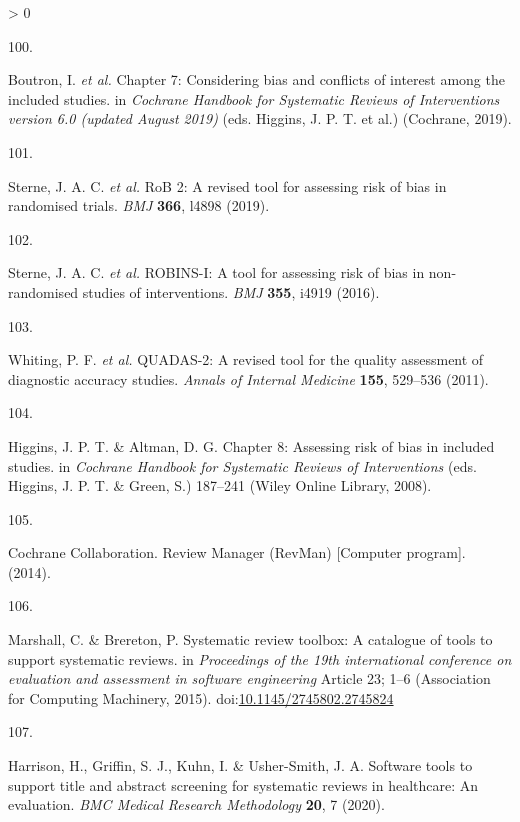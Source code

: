 \documentclass[a4paper, twoside]{templates/ociamthesis}
\newlength{\cslhangindent}
\newlength{\csllabelwidth}
\newenvironment{CSLReferences}[3] %
 {%
  \setlength{\parindent}{0pt}
  \ifodd #1 \everypar{\setlength{\hangindent}{\cslhangindent}}\ignorespaces\fi
  \ifnum #2 > 0
  \setlength{\parskip}{#2\baselineskip}
  \fi
 }%
 {}
\newcommand{\CSLLeftMargin}[1]{\parbox[t]{\maxof{\widthof{#1}}{\csllabelwidth}}{#1}}
\newcommand{\CSLRightInline}[1]{\parbox[t]{\linewidth - \csllabelwidth}{#1}}
\begin{document}
\begin{CSLReferences}{0}{0}
\leavevmode\hypertarget{ref-cochranechpt7}{}%
\CSLLeftMargin{100. }
\CSLRightInline{Boutron, I. \emph{et al.} Chapter 7: {Considering} bias and conflicts of interest among the included studies. in \emph{Cochrane {Handbook} for {Systematic Reviews} of {Interventions} version 6.0 (updated {August} 2019)} (eds. Higgins, J. P. T. et al.) ({Cochrane}, 2019).}

\leavevmode\hypertarget{ref-sterne2019rob}{}%
\CSLLeftMargin{101. }
\CSLRightInline{Sterne, J. A. C. \emph{et al.} {RoB} 2: A revised tool for assessing risk of bias in randomised trials. \emph{BMJ} \textbf{366}, l4898 (2019).}

\leavevmode\hypertarget{ref-sterne2016robins}{}%
\CSLLeftMargin{102. }
\CSLRightInline{Sterne, J. A. C. \emph{et al.} {ROBINS}-{I}: A tool for assessing risk of bias in non-randomised studies of interventions. \emph{BMJ} \textbf{355}, i4919 (2016).}

\leavevmode\hypertarget{ref-whiting2011quadas}{}%
\CSLLeftMargin{103. }
\CSLRightInline{Whiting, P. F. \emph{et al.} {QUADAS}-2: A revised tool for the quality assessment of diagnostic accuracy studies. \emph{Annals of Internal Medicine} \textbf{155}, 529--536 (2011).}

\leavevmode\hypertarget{ref-higgins2008assessing}{}%
\CSLLeftMargin{104. }
\CSLRightInline{Higgins, J. P. T. \& Altman, D. G. Chapter 8: {Assessing} risk of bias in included studies. in \emph{Cochrane {Handbook} for {Systematic Reviews} of {Interventions}} (eds. Higgins, J. P. T. \& Green, S.) 187--241 ({Wiley Online Library}, 2008).}

\leavevmode\hypertarget{ref-cochrane2014review}{}%
\CSLLeftMargin{105. }
\CSLRightInline{Cochrane Collaboration. Review {Manager} ({RevMan}) {[}{Computer} program{]}. (2014).}

\leavevmode\hypertarget{ref-marshall2015systematic}{}%
\CSLLeftMargin{106. }
\CSLRightInline{Marshall, C. \& Brereton, P. Systematic review toolbox: A catalogue of tools to support systematic reviews. in \emph{Proceedings of the 19th international conference on evaluation and assessment in software engineering} Article 23; 1--6 ({Association for Computing Machinery}, 2015). doi:\href{https://doi.org/10.1145/2745802.2745824}{10.1145/2745802.2745824}}

\leavevmode\hypertarget{ref-harrison2020software}{}%
\CSLLeftMargin{107. }
\CSLRightInline{Harrison, H., Griffin, S. J., Kuhn, I. \& Usher-Smith, J. A. Software tools to support title and abstract screening for systematic reviews in healthcare: An evaluation. \emph{BMC Medical Research Methodology} \textbf{20}, 7 (2020).}


\end{CSLReferences}
\end{document}
